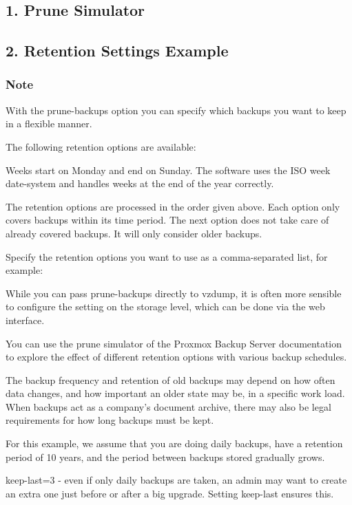 \subsection{1. Prune Simulator}

\subsection{2. Retention Settings Example}

\subsubsection{Note}

With the prune-backups option you can specify which backups you want to keep in a flexible manner.

The following retention options are available:

Weeks start on Monday and end on Sunday. The software uses the ISO week date-system and handles weeks at the end of the year correctly.

The retention options are processed in the order given above. Each option only covers backups within its time period. The next option does not take care of already covered backups. It will only consider older backups.

Specify the retention options you want to use as a comma-separated list, for example:

While you can pass prune-backups directly to vzdump, it is often more sensible to configure the setting on the storage level, which can be done via the web interface.

You can use the prune simulator of the Proxmox Backup Server documentation to explore the effect of different retention options with various backup schedules.

The backup frequency and retention of old backups may depend on how often data changes, and how important an older state may be, in a specific work load. When backups act as a company’s document archive, there may also be legal requirements for how long backups must be kept.

For this example, we assume that you are doing daily backups, have a retention period of 10 years, and the period between backups stored gradually grows.

keep-last=3 - even if only daily backups are taken, an admin may want to create an extra one just before or after a big upgrade. Setting keep-last ensures this.

